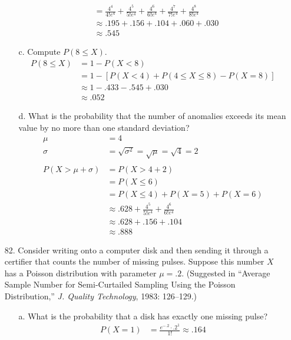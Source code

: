 \documentclass[letterpaper,12pt]{article}
\newcommand{\poisson}[2]{%
  \frac{e^{-#2} \cdot #2^{#1}}{#1!}%
}
\begin{document}
\begin{enumerate}
\begin{enumerate}
\begin{align*}
          &= \frac{4^4}{4!e^4} + \frac{4^5}{5!e^4} + \frac{4^6}{6!e^4} + \frac{4^7}{7!e^4} + \frac{4^8}{8!e^4} \\
          &\approx .195 + .156 + .104 + .060 + .030 \\
          &\approx .545
        \end{align*}
      \item[c.]
        Compute $P(8 \le X)$.
        \begin{align*}
          P(8 \le X) &= 1 - P(X < 8) \\
          &= 1 - [P(X < 4) + P(4 \le X \le 8) - P(X = 8)] \\
          &\approx 1 - .433  - .545 + .030 \\
          &\approx .052
        \end{align*}
      \item[d.]
        What is the probability that the number of anomalies exceeds its mean value by no more than one standard deviation?
        \begin{align*}
          \mu &= 4 \\
          \sigma &= \sqrt{\sigma^2} = \sqrt{\mu} = \sqrt{4} = 2 \\
          \\
          P(X > \mu + \sigma) &= P(X > 4 + 2) \\
          &= P(X \le 6) \\
          &= P(X \le 4) + P(X = 5) + P(X = 6) \\
          &\approx .628 + \frac{4^5}{5!e^4} + \frac{4^6}{6!e^4} \\
          &\approx .628 + .156 + .104 \\
          &\approx .888
        \end{align*}
    \end{enumerate}
  \item[82.]
    Consider writing onto a computer disk and then sending it through a certifier that counts the number of missing pulses. Suppose this number $X$ has a Poisson distribution with parameter $\mu = .2$. (Suggested in ``Average Sample Number for Semi-Curtailed Sampling Using the Poisson Distribution,'' \textit{J. Quality Technology}, 1983: 126–129.)
    \begin{enumerate}
      \item[a.]
        What is the probability that a disk has exactly one missing pulse?
        \begin{align*}
          P(X = 1) &= \poisson{1}{.2} \approx .164
        \end{align*}

\end{enumerate}
\end{enumerate}
\end{document}
